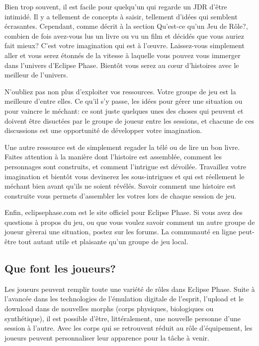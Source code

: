 Bien trop souvent, il est facile pour quelqu'un qui regarde un JDR d'être intimidé. Il y a tellement de concepts à saisir, tellement d'idées qui semblent écrasantes. Cependant, comme décrit à la section Qu'est-ce qu'un Jeu de Rôle?, combien de fois avez-vous lus un livre ou vu un film et décidés que vous auriez fait mieux? C'est votre imagination qui est à l'œuvre. Laissez-vous simplement aller et vous serez étonnés de la vitesse à laquelle vous pouvez vous immerger dans l'univers d'Eclipse Phase. Bientôt vous serez au cœur d'histoires avec le meilleur de l'univers. 

N'oubliez pas non plus d'exploiter vos ressources. Votre groupe de jeu est la meilleure d'entre elles. Ce qu'il s'y passe, les idées pour gérer une situation ou pour vaincre le méchant: ce sont juste quelques unes des choses qui peuvent et doivent être disuctées par le groupe de joueur entre les sessions, et chacune de ces discussions est une opportunité de développer votre imagination. 

Une autre ressource est de simplement regader la télé ou de lire un bon livre. Faites attention à la manière dont l'histoire est assemblée, comment les personnages sont construits, et comment l'intrigue est dévoilée. Travaillez votre imagination et bientôt vous devinerez les sous-intrigues et qui est réellement le méchant bien avant qu'ils ne soient révélés. Savoir comment une histoire est construite vous permets d'assembler les votres lors de chaque session de jeu. 

Enfin, eclipsephase.com est le site officiel pour Eclipse Phase. Si vous avez des questions à propos du jeu, ou que vous voulez savoir comment un autre groupe de joueur gèrerai une situation, postez sur les forums. La communauté en ligne peut-être tout autant utile et plaisante qu'un groupe de jeu local. 



\subsection{Que font les joueurs?} \label{sec:what-do-players} 

Les joueurs peuvent remplir toute une variété de rôles dans Eclipse Phase. Suite à l'avancée dans les technologies de l'émulation digitale de l'esprit, l'upload et le download dans de nouvelles morphs (corps physiques, biologiques ou synthétique), il est possible d'être, littéralement, une nouvelle personne d'une session à l'autre. Avec les corps qui se retrouvent réduit au rôle d'équipement, les joueurs peuvent personnaliser leur apparence pour la tâche à venir. 



